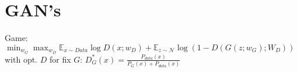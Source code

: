 \section*{GAN's}
Game: $\min_{w_G} \max_{w_D} \mathbb{E}_{x\sim Data} \log D(x;w_D) + \mathbb{E}_{z\sim \mathcal{N}} \log \left(1- D(G(z;w_G);W_D) \right)$ with opt. $D$ for fix $G$: $D^*_G (x) = \frac{P_{data}(x)}{P_G(x) + P_{data}(x)}$